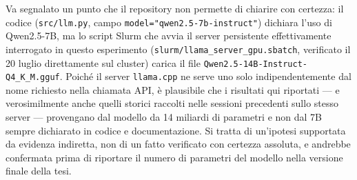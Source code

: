 Va segnalato un punto che il repository non permette di chiarire con certezza: il codice (\texttt{src/llm.py}, campo \texttt{model="qwen2.5-7b-instruct"}) dichiara l'uso di Qwen2.5-7B, ma lo script Slurm che avvia il server persistente effettivamente interrogato in questo esperimento (\texttt{slurm/llama\_server\_gpu.sbatch}, verificato il 20 luglio direttamente sul cluster) carica il file \texttt{Qwen2.5-14B-Instruct-Q4\_K\_M.gguf}. Poiché il server \texttt{llama.cpp} ne serve uno solo indipendentemente dal nome richiesto nella chiamata API, è plausibile che i risultati qui riportati --- e verosimilmente anche quelli storici raccolti nelle sessioni precedenti sullo stesso server --- provengano dal modello da 14 miliardi di parametri e non dal 7B sempre dichiarato in codice e documentazione. Si tratta di un'ipotesi supportata da evidenza indiretta, non di un fatto verificato con certezza assoluta, e andrebbe confermata prima di riportare il numero di parametri del modello nella versione finale della tesi.
